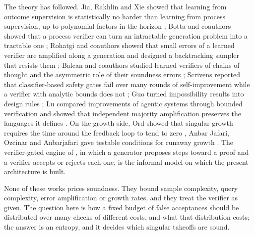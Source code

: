 The theory has followed. Jia, Rakhlin and Xie showed that learning from outcome supervision is statistically no harder than learning from process supervision, up to polynomial factors in the horizon \cite{JRX25}; Botta and coauthors showed that a process verifier can turn an intractable generation problem into a tractable one \cite{BLM25}; Rohatgi and coauthors showed that small errors of a learned verifier are amplified along a generation and designed a backtracking sampler that resists them \cite{RSS25}; Balcan and coauthors studied learned verifiers of chains of thought and the asymmetric role of their soundness errors \cite{BBF26}; Scrivens reported that classifier-based safety gates fail over many rounds of self-improvement while a verifier with analytic bounds does not \cite{Scr26}; Guo turned impossibility results into design rules \cite{Guo26}; Lu compared improvements of agentic systems through bounded verification and showed that independent majority amplification preserves the languages it defines \cite{Lu26}. On the growth side, Ord showed that singular growth requires the time around the feedback loop to tend to zero \cite{Ord26}, Anbar Jafari, Ozcinar and Anbarjafari gave testable conditions for runaway growth \cite{AOA25}. The verifier-gated engine of \cite{Bha26a}, in which a generator proposes steps toward a proof and a verifier accepts or rejects each one, is the informal model on which the present architecture is built.

None of these works prices soundness. They bound sample complexity, query complexity, error amplification or growth rates, and they treat the verifier as given. The question here is how a fixed budget of false acceptances should be distributed over many checks of different costs, and what that distribution costs; the answer is an entropy, and it decides which singular takeoffs are sound.

